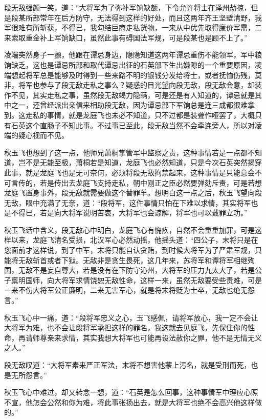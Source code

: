 段无敌强颜一笑，道：“大将军为了弥补军饷缺额，下令允许将士在泽州劫掠，但是段某所部常年在后方防守，无法得到这样的好处，而且这两年齐王坚壁清野，我军很难有所斩获，不得已，我勾结巨商走私货物，一来从中优先取得廉价军需，二来索取重金补上军饷缺口，虽然此事有碍国法军规，可是段某也是顾不上了。”

凌端突然身子一颤，他跟在谭忌身边，隐隐知道这两年谭忌重伤不能领军，军中粮饷缺乏，这也是谭忌所部和取代谭忌出征的石英部下生出嫌隙的一个重要原因，凌端想起将军总是能够及时得到一些来路不明的银钱分发给将士，或者抚恤伤残，莫非，将军也参与了段无敌走私之事么？疑惑的目光望向段无敌，段无敌会意，却装作不见，其实走私之事，虽然段无敌竭力隐瞒，可是还是有人知道的，谭忌就是其中之一，还曾经派出亲信来相助段无敌，因为谭忌部下军饷总是连三成都很难拿到。这走私的事情，就是龙庭飞也未必不知道，只不过都是装聋作哑罢了，大概只有石英这个直肠子不知此事。不过事已至此，段无敌当然不会牵连旁人，所以对凌端的疑心视而不见。

秋玉飞也想到了这一点，他师兄萧桐掌管军中监察之责，这种事情若是一点都不知道，岂不是无能至极，萧桐若是知道，龙庭飞也必然知道，只是今次石英突然揭穿此事，就是龙庭飞也是无可奈何，必须将段无敌拘禁起来，这种事情是只能意会不可言传的，若是传出去龙庭飞支持走私，朝中刚正之臣必然要弹劾斥责，可是若想龙庭飞置身事外，段无敌就需要做这个替罪羊。想明白这一点之后，秋玉飞望向段无敌，眼中充满了无奈，道：“段将军，这件事情只怕在下难以求情，其实将军也是不得已，若是向大将军说明苦衷，大将军也会谅解，将军也可以戴罪立功。”

秋玉飞话中含义，段无敌心中明白，龙庭飞心有愧疚，自然不会重重加罪，可是这样以来，龙庭飞清名受损，北汉军心必然动摇，他摇头道：“四公子，末将只是在您面前才这样说，到了中军，末将只能自认贪贿，到时候大将军为了严肃军规，只能将无敌斩首或者下狱。无敌非是贪生畏死，这几年来，苏将军和谭将军相继殉国，无敌不是妄自尊大，若是没有在下防守沁州，大将军的压力九太大了，若是公子禀明国师，向大将军求情饶恕无敌性命，这样一来，虽然无敌要受些责难，可是一来不伤大将军公正廉明，二来无害军心，就是将末将贬为士卒，无敌也绝无怨言。”

秋玉飞心中一痛，道：“段将军忠义之心，玉飞感佩，请将军放心，我一定不会让大将军为难，也不会让段将军承担这样的罪名，我这就去见庭飞，先保住你的性命，再请师尊亲来求情，其实我想大将军也可能再设法赦你之罪，他不是无情无义之人。”

段无敌叹道：“大将军素来严正军法，末将不想害他蒙上污名，就是受刑而死，也是无所怨言。”

秋玉飞心中难过，却又转念一想，道：“石英是怎么回事，这种事情军中理应心照不宣，他怎会公然和你为难，将此事张扬出去，就是大将军也绝不会高兴他这样做的。”


